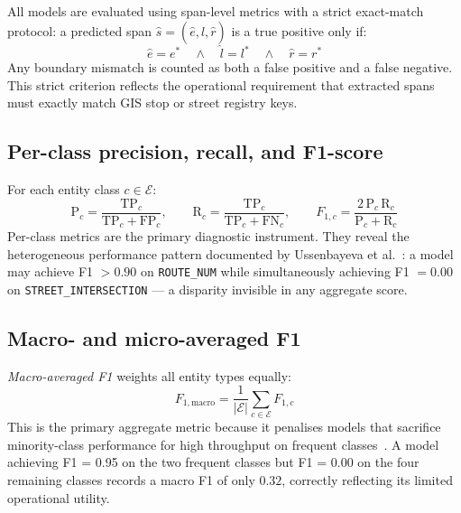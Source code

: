 All models are evaluated using span-level metrics with a strict exact-match protocol: a predicted span $\hat{s} = (\hat{e}, \hat{l}, \hat{r})$ is a true positive only if:
\begin{equation}
  \hat{e} = e^* \quad \wedge \quad \hat{l} = l^* \quad \wedge \quad \hat{r} = r^*
  \label{eq:tp_condition}
\end{equation}
Any boundary mismatch is counted as both a false positive and a false negative. This strict criterion reflects the operational requirement that extracted spans must exactly match GIS stop or street registry keys.

\subsection{Per-class precision, recall, and F1-score}
\label{sec:per_class_metrics}

For each entity class $c \in \mathcal{E}$:
\begin{equation}
  \mathrm{P}_c = \frac{\mathrm{TP}_c}{\mathrm{TP}_c + \mathrm{FP}_c}, \qquad
  \mathrm{R}_c = \frac{\mathrm{TP}_c}{\mathrm{TP}_c + \mathrm{FN}_c}, \qquad
  F_{1,c} = \frac{2\,\mathrm{P}_c\,\mathrm{R}_c}{\mathrm{P}_c + \mathrm{R}_c}
  \label{eq:per_class_f1}
\end{equation}
Per-class metrics are the primary diagnostic instrument. They reveal the heterogeneous performance pattern documented by Ussenbayeva et al.~\cite{ussenbayeva2026heterogeneous}: a model may achieve F1 $> 0.90$ on \texttt{ROUTE\_NUM} while simultaneously achieving F1 $= 0.00$ on \texttt{STREET\_INTERSECTION} — a disparity invisible in any aggregate score.

\subsection{Macro- and micro-averaged F1}
\label{sec:agg_metrics}

\textit{Macro-averaged F1} weights all entity types equally:
\begin{equation}
  F_{1,\text{macro}} = \frac{1}{|\mathcal{E}|} \sum_{c \in \mathcal{E}} F_{1,c}
  \label{eq:macro_f1}
\end{equation}
This is the primary aggregate metric because it penalises models that sacrifice minority-class performance for high throughput on frequent classes~\cite{keraghel2024survey}. A model achieving F1 = 0.95 on the two frequent classes but F1 = 0.00 on the four remaining classes records a macro F1 of only $0.32$, correctly reflecting its limited operational utility.

